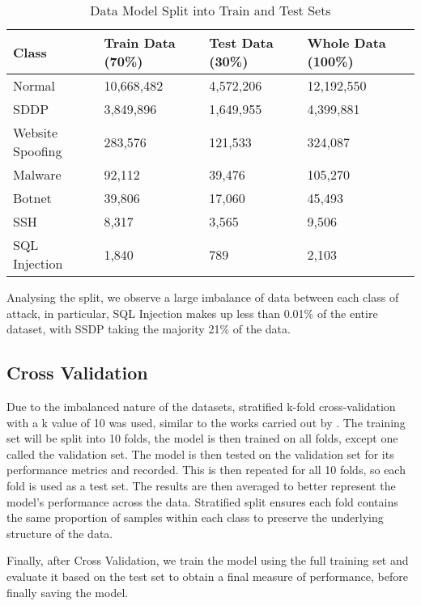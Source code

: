 \begin{table}[H]
\begin{tabular}{llll}
\textbf{Class}   & \textbf{Train Data (70\%)} & \textbf{Test Data (30\%)} & \textbf{Whole Data (100\%)} \\ \hline
Normal           & 10,668,482                       &   4,572,206           & 12,192,550                  \\
SDDP             & 3,849,896                &     1,649,955            & 4,399,881                   \\
Website Spoofing & 283,576            &     121,533       & 324,087                     \\
Malware          &  92,112                     &     39,476               & 105,270                     \\
Botnet           & 39,806                    &     17,060          & 45,493                      \\
SSH              & 8,317              &       3,565             & 9,506                       \\
SQL Injection    & 1,840                &     789                  & 2,103                  \\ \hline
\end{tabular}
\caption{Data Model Split into Train and Test Sets}
\label{tab:split_data}
\end{table}

Analysing the split, we observe a large imbalance of data between each class of attack, in particular, SQL Injection makes up less than 0.01\% of the entire dataset, with SSDP taking the majority 21\% of the data. 


\subsection{Cross Validation}

Due to the imbalanced nature of the datasets, stratified k-fold cross-validation with a k value of 10 was used, similar to the works carried out by \textcite{s22155633}. The training set will be split into 10 folds, the model is then trained on all folds, except one called the validation set. The model is then tested on the validation set for its performance metrics and recorded. This is then repeated for all 10 folds, so each fold is used as a test set. The results are then averaged to better represent the model's performance across the data. Stratified split ensures each fold contains the same proportion of samples within each class to preserve the underlying structure of the data. 

Finally, after Cross Validation, we train the model using the full training set and evaluate it based on the test set to obtain a final measure of performance, before finally saving the model.